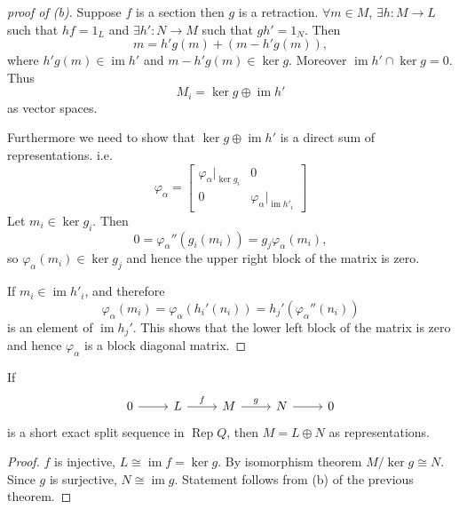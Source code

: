 \documentclass[11pt, a4paper]{report}
\begin{document}
\begin{proof}[proof of (b)]
    Suppose $f$ is a section then $g$ is a retraction. $\forall m \in M$, $\exists h: M\to L$ such that $hf=1_L$ and $\exists h': N\to M$ such that $gh'=1_N$. Then
    \[
        m=h'g(m)+(m-h'g(m)),
    \]
    where $h'g(m) \in \operatorname{im}h'$ and $m-h'g(m) \in \operatorname{ker}g$. Moreover $\operatorname{im}h' \cap \operatorname{ker}g = 0$. Thus
    \[
        M_i = \operatorname{ker}g \oplus \operatorname{im}h'
    \]
    as vector spaces.

    Furthermore we need to show that $\operatorname{ker}g \oplus \operatorname{im}h'$ is a direct sum of representations. i.e.
    \[
        \varphi_\alpha=\begin{bmatrix}
            \varphi_\alpha |_{\operatorname{ker}g_i } & 0                                         \\
            0                                         & \varphi_\alpha |_{\operatorname{im}h'_i }
        \end{bmatrix}
    \]
    Let $m_i \in \operatorname{ker}g_i$. Then
    \[
        0=\varphi_\alpha''(g_i(m_i))=g_j \varphi_\alpha (m_i),
    \]
    so $\varphi_\alpha (m_i) \in \operatorname{ker}g_j$ and hence the upper right block of the matrix is zero.

    If $m_i \in \operatorname{im}h'_i$, and therefore
    \[
        \varphi_\alpha(m_i)=\varphi_\alpha(h_i'(n_i))=h_j'(\varphi_\alpha''(n_i))
    \]
    is an element of $\operatorname{im}h_j'$. This shows that the lower left block of the matrix is zero and hence $\varphi_\alpha$ is a block diagonal matrix.
\end{proof}

\begin{corollary}
    If
    \[
        \begin{tikzcd}
            0 \arrow[r] & L \arrow[r, "f"] & M \arrow[r, "g"] & N \arrow[r] & 0
        \end{tikzcd}
    \]
    is a short exact split sequence in $\operatorname{Rep}Q$, then $M = L \oplus N$ as representations.
\end{corollary}

\begin{proof}
    $f$ is injective, $L \cong \operatorname{im}f = \operatorname{ker}g$. By isomorphism theorem $M  / \operatorname{ker}g \cong N$. Since $g$ is surjective, $N \cong \operatorname{im}g$. Statement follows from (b) of the previous theorem.
\end{proof}
\end{document}
